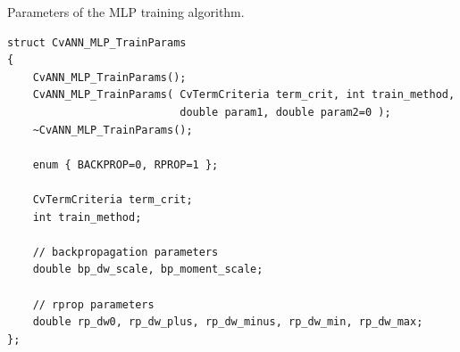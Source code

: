 Parameters of the MLP training algorithm.

\begin{lstlisting}
struct CvANN_MLP_TrainParams
{
    CvANN_MLP_TrainParams();
    CvANN_MLP_TrainParams( CvTermCriteria term_crit, int train_method,
                           double param1, double param2=0 );
    ~CvANN_MLP_TrainParams();

    enum { BACKPROP=0, RPROP=1 };

    CvTermCriteria term_crit;
    int train_method;

    // backpropagation parameters
    double bp_dw_scale, bp_moment_scale;

    // rprop parameters
    double rp_dw0, rp_dw_plus, rp_dw_minus, rp_dw_min, rp_dw_max;
};
\end{lstlisting}


